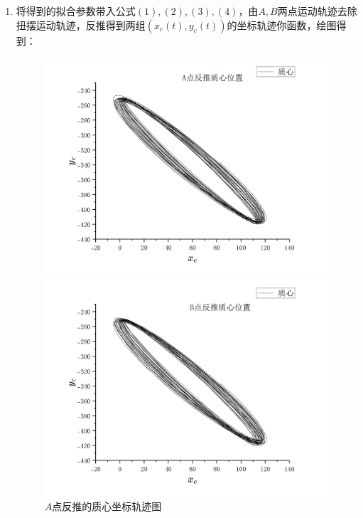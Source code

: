 \documentclass[11pt]{article}
\begin{document}
\begin{enumerate}
\begin{enumerate}
        \item 将得到的拟合参数带入公式$(1),(2),(3),(4)$，由$A,B$两点运动轨迹去除扭摆运动轨迹，反推得到两组$(x_c(t),y_c(t))$的坐标轨迹你函数，绘图得到：
        
        \begin{figure}[H]
            \centering
            \begin{minipage}[t]{0.48\textwidth}
                \centering
                \includegraphics[width=\linewidth]{Figs/Ex1.A.c.png}
                \vspace{-0.5cm}
                \caption{$A$点反推的质心坐标轨迹图}
            \end{minipage}
            \hfill
            \begin{minipage}[t]{0.48\textwidth}
                \centering
                \includegraphics[width=\linewidth]{Figs/Ex1.B.c.png}

\end{minipage}
\end{figure}
\end{enumerate}
\end{enumerate}
\end{document}
